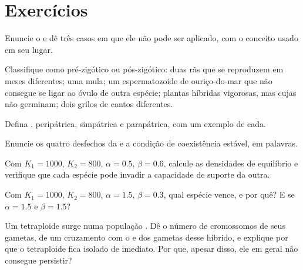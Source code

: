 \section{Exercícios}

\begin{exercise}[$\star$]\label{exo:b2:speciation:1}
Enuncie o  e dê três casos em que ele não
pode ser aplicado, com o conceito usado em seu lugar.
\end{exercise}

\begin{exercise}[$\star$]\label{exo:b2:speciation:2}
Classifique como pré-zigótico ou pós-zigótico: duas rãs que se
reproduzem em meses diferentes; uma mula; um espermatozoide de ouriço-do-mar
que não consegue se ligar ao óvulo de outra espécie; plantas híbridas
vigorosas, mas cujas  não germinam; dois grilos de cantos
diferentes.
\end{exercise}

\begin{exercise}[$\star$]\label{exo:b2:speciation:3}
Defina , peripátrica, simpátrica e parapátrica,
com um exemplo de cada.
\end{exercise}

\begin{exercise}[$\star$]\label{exo:b2:speciation:4}
Enuncie os quatro desfechos da  e a
condição de coexistência estável, em palavras.
\end{exercise}

\begin{exercise}[$\star\star$]\label{exo:b2:speciation:5}
Com $K_1 = 1000$, $K_2 = 800$, $\alpha = 0.5$, $\beta = 0.6$,
calcule as densidades de equilíbrio e verifique que cada espécie pode
invadir a capacidade de suporte da outra.
\end{exercise}

\begin{exercise}[$\star\star$]\label{exo:b2:speciation:6}
Com $K_1 = 1000$, $K_2 = 800$, $\alpha = 1.5$, $\beta = 0.3$, qual
espécie vence, e por quê? E se $\alpha = 1.5$ e $\beta = 1.5$?
\end{exercise}

\begin{exercise}[$\star\star$]\label{exo:b2:speciation:7}
Um tetraploide surge numa população . Dê o número de
cromossomos de seus gametas, de um cruzamento com o  e dos
gametas desse híbrido, e explique por que o tetraploide fica isolado de
imediato. Por que, apesar disso, ele em geral não consegue persistir?
\end{exercise}

